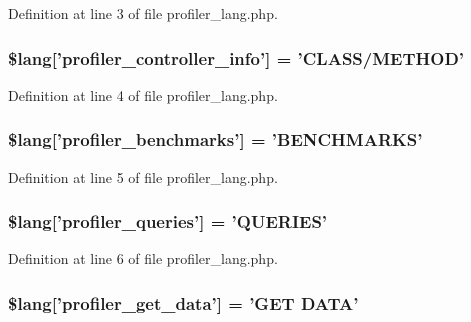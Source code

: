 Definition at line 3 of file profiler\-\_\-lang.\-php.

\hypertarget{profiler__lang_8php_a13e794a194b3fae4ac89472fa90a39a4}{
\subsubsection[{\$lang}]{\setlength{\rightskip}{0pt plus 5cm}\$lang\mbox{[}'profiler\-\_\-controller\-\_\-info'\mbox{]} = 'C\-L\-A\-S\-S/M\-E\-T\-H\-O\-D'}}\label{profiler__lang_8php_a13e794a194b3fae4ac89472fa90a39a4}


Definition at line 4 of file profiler\-\_\-lang.\-php.

\hypertarget{profiler__lang_8php_a542e9f6b34cf149d1574a8f6b2c9568d}{
\subsubsection[{\$lang}]{\setlength{\rightskip}{0pt plus 5cm}\$lang\mbox{[}'profiler\-\_\-benchmarks'\mbox{]} = 'B\-E\-N\-C\-H\-M\-A\-R\-K\-S'}}\label{profiler__lang_8php_a542e9f6b34cf149d1574a8f6b2c9568d}


Definition at line 5 of file profiler\-\_\-lang.\-php.

\hypertarget{profiler__lang_8php_ac8efd051248fb102a6cc0c9b418ffd6d}{
\subsubsection[{\$lang}]{\setlength{\rightskip}{0pt plus 5cm}\$lang\mbox{[}'profiler\-\_\-queries'\mbox{]} = 'Q\-U\-E\-R\-I\-E\-S'}}\label{profiler__lang_8php_ac8efd051248fb102a6cc0c9b418ffd6d}


Definition at line 6 of file profiler\-\_\-lang.\-php.

\hypertarget{profiler__lang_8php_aed0d74a29b2ef17977baa94091d06058}{
\subsubsection[{\$lang}]{\setlength{\rightskip}{0pt plus 5cm}\$lang\mbox{[}'profiler\-\_\-get\-\_\-data'\mbox{]} = 'G\-E\-T D\-A\-T\-A'}}\label{profiler__lang_8php_aed0d74a29b2ef17977baa94091d06058}


